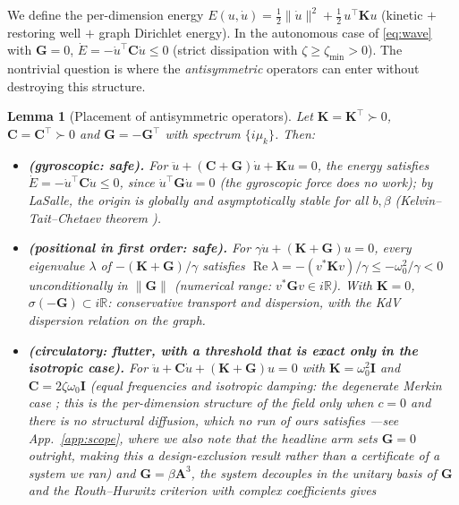 \documentclass{article}
\newtheorem{lemma}{Lemma}
\begin{document}
We define the per-dimension energy
$E(u,\dot u)=\tfrac12\lVert\dot u\rVert^2+\tfrac12\,u^\top\mathbf{K}u$
(kinetic $+$ restoring well $+$ graph Dirichlet energy). In the autonomous case
of \eqref{eq:wave} with $\mathbf{G}=0$,
$\dot E=-\dot u^\top\mathbf{C}\dot u\le 0$ (strict dissipation with
$\zeta\ge\zeta_{\min}>0$). The nontrivial question is where the
\emph{antisymmetric} operators can enter without destroying this structure.

\begin{lemma}[Placement of antisymmetric operators]
\label{lem:placement}
Let $\mathbf{K}=\mathbf{K}^\top\succ0$, $\mathbf{C}=\mathbf{C}^\top\succ0$ and
$\mathbf{G}=-\mathbf{G}^\top$ with spectrum $\{i\mu_k\}$. Then:
\begin{itemize}
  \item[(a)] \textbf{(gyroscopic: safe).} For
  $\ddot u+(\mathbf{C}+\mathbf{G})\dot u+\mathbf{K}u=0$, the energy satisfies
  $\dot E=-\dot u^\top\mathbf{C}\dot u\le0$, since
  $\dot u^\top\mathbf{G}\dot u=0$ (the gyroscopic force does no work); by
  LaSalle, the origin is globally and asymptotically stable \emph{for all}
  $b,\beta$ (Kelvin--Tait--Chetaev theorem \citep{merkin1997,kirillov2013}).
  \item[(b)] \textbf{(positional in first order: safe).} For
  $\gamma\dot u+(\mathbf{K}+\mathbf{G})u=0$, every eigenvalue $\lambda$ of
  $-(\mathbf{K}+\mathbf{G})/\gamma$ satisfies
  $\operatorname{Re}\lambda=-(v^*\mathbf{K}v)/\gamma\le-\omega_0^2/\gamma<0$
  unconditionally in $\lVert\mathbf{G}\rVert$ (numerical range:
  $v^*\mathbf{G}v\in i\mathbb{R}$). With $\mathbf{K}=0$,
  $\sigma(-\mathbf{G})\subset i\mathbb{R}$: conservative transport and
  dispersion, with the KdV dispersion relation on the graph.
  \item[(c)] \textbf{(circulatory: flutter, with a threshold that is exact only
  in the isotropic case).} For
  $\ddot u+\mathbf{C}\dot u+(\mathbf{K}+\mathbf{G})u=0$ with
  $\mathbf{K}=\omega_0^2\mathbf{I}$ \emph{and} $\mathbf{C}=2\zeta\omega_0\mathbf{I}$
  (equal frequencies and isotropic damping: the degenerate Merkin
  case \citep{merkin1997}; this is the per-dimension structure of the field only
  when $c{=}0$ and there is no structural diffusion, which no run of ours
  satisfies ---see App.~\ref{app:scope}, where we also note that the headline
  arm sets $\mathbf{G}=0$ outright, making this a design-exclusion result
  rather than a certificate of a system we ran) and
  $\mathbf{G}=\beta\mathbf{A}^3$, the system decouples in the unitary basis of
  $\mathbf{G}$ and the Routh--Hurwitz criterion with complex coefficients gives

\end{itemize}
\end{lemma}
\end{document}
